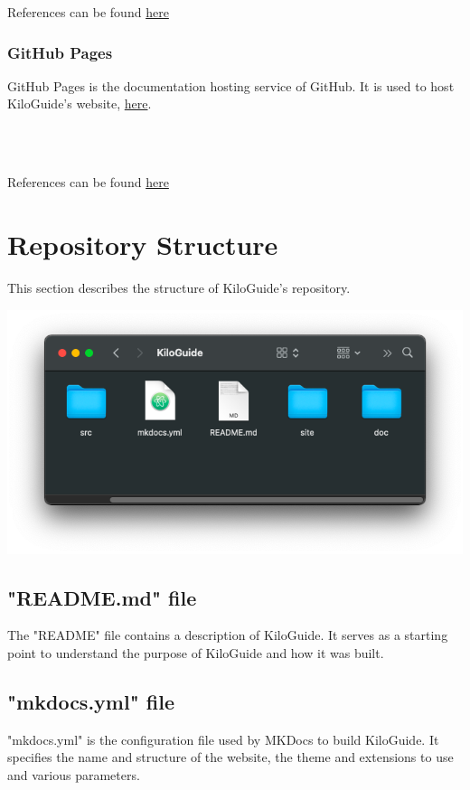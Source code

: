 \documentclass[a4paper,12pt,titlepage]{scrartcl}
\begin{document}
References can be found \href{https://github.com/}{here}

\subsubsection{GitHub Pages}

GitHub Pages is the documentation hosting service of GitHub. It is used to host KiloGuide's website, \href{https://simlej18.github.io/KiloGuide/}{here}.

\\\

References can be found \href{https://pages.github.com}{here}

\section{Repository Structure}

This section describes the structure of KiloGuide's repository.

\begin{center}
    \includegraphics[scale=0.5]{structure.png}
\end{center}

\subsection{"README.md" file}

The "README" file contains a description of KiloGuide. It serves as a starting point to understand the purpose of KiloGuide and how it was built.

\subsection{"mkdocs.yml" file}

"mkdocs.yml" is the configuration file used by MKDocs to build KiloGuide. It specifies the name and structure of the website, the theme and extensions to use and various parameters.
\end{document}
